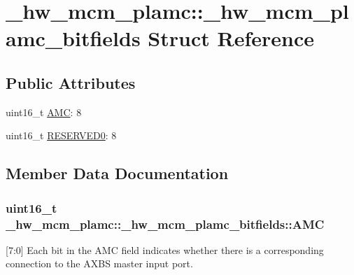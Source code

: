 \hypertarget{struct__hw__mcm__plamc_1_1__hw__mcm__plamc__bitfields}{}\section{\+\_\+hw\+\_\+mcm\+\_\+plamc\+:\+:\+\_\+hw\+\_\+mcm\+\_\+plamc\+\_\+bitfields Struct Reference}
\label{struct__hw__mcm__plamc_1_1__hw__mcm__plamc__bitfields}
\subsection*{Public Attributes}
\begin{DoxyCompactItemize}
\item 
uint16\+\_\+t \hyperlink{struct__hw__mcm__plamc_1_1__hw__mcm__plamc__bitfields_a320d4af2d76b1232bc5806241a9ac102}{A\+MC}\+: 8
\item 
uint16\+\_\+t \hyperlink{struct__hw__mcm__plamc_1_1__hw__mcm__plamc__bitfields_a66975faeb54ccf2ebfafcbb9023edda8}{R\+E\+S\+E\+R\+V\+E\+D0}\+: 8
\end{DoxyCompactItemize}


\subsection{Member Data Documentation}
\subsubsection[{\texorpdfstring{A\+MC}{AMC}}]{\setlength{\rightskip}{0pt plus 5cm}uint16\+\_\+t \+\_\+hw\+\_\+mcm\+\_\+plamc\+::\+\_\+hw\+\_\+mcm\+\_\+plamc\+\_\+bitfields\+::\+A\+MC}\hypertarget{struct__hw__mcm__plamc_1_1__hw__mcm__plamc__bitfields_a320d4af2d76b1232bc5806241a9ac102}{}\label{struct__hw__mcm__plamc_1_1__hw__mcm__plamc__bitfields_a320d4af2d76b1232bc5806241a9ac102}
\mbox{[}7\+:0\mbox{]} Each bit in the A\+MC field indicates whether there is a corresponding connection to the A\+X\+BS master input port. 
